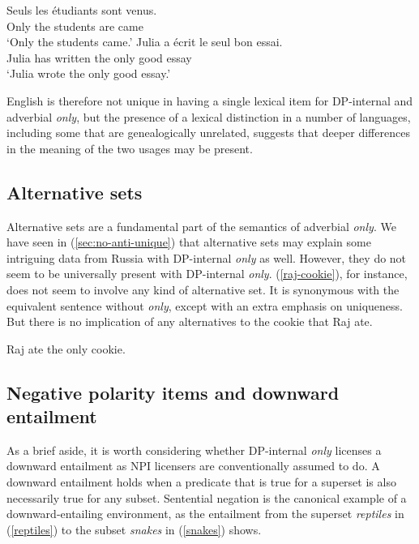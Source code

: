 \documentclass{article}
\begin{document}
\begin{exe}
	\ex \gll Seuls les \'{e}tudiants sont venus.\\
	Only the students are came\\
	\glt `Only the students came.'
	\ex \gll Julia a \'{e}crit le seul bon essai.\\
	Julia has written the only good essay\\
	\glt `Julia wrote the only good essay.'
\end{exe}

English is therefore not unique in having a single lexical item for DP-internal and adverbial \textit{only}, but the presence of a lexical distinction in a number of languages, including some that are genealogically unrelated, suggests that deeper differences in the meaning of the two usages may be present.

\subsection{Alternative sets}
Alternative sets are a fundamental part of the semantics of adverbial \textit{only}. We have seen in (\ref{sec:no-anti-unique}) that alternative sets may explain some intriguing data from Russia with DP-internal \textit{only} as well. However, they do not seem to be universally present with DP-internal \textit{only}. (\ref{raj-cookie}), for instance, does not seem to involve any kind of alternative set. It is synonymous with the equivalent sentence without \textit{only}, except with an extra emphasis on uniqueness. But there is no implication of any alternatives to the cookie that Raj ate.

\begin{exe}
	\ex \label{raj-cookie} Raj ate the only cookie.
\end{exe}


\subsection{Negative polarity items and downward entailment}
As a brief aside, it is worth considering whether DP-internal \textit{only} licenses a downward entailment as NPI licensers are conventionally assumed to do. A downward entailment holds when a predicate that is true for a superset is also necessarily true for any subset. Sentential negation is the canonical example of a downward-entailing environment, as the entailment from the superset \textit{reptiles} in (\ref{reptiles}) to the subset \textit{snakes} in (\ref{snakes}) shows.
\end{document}
